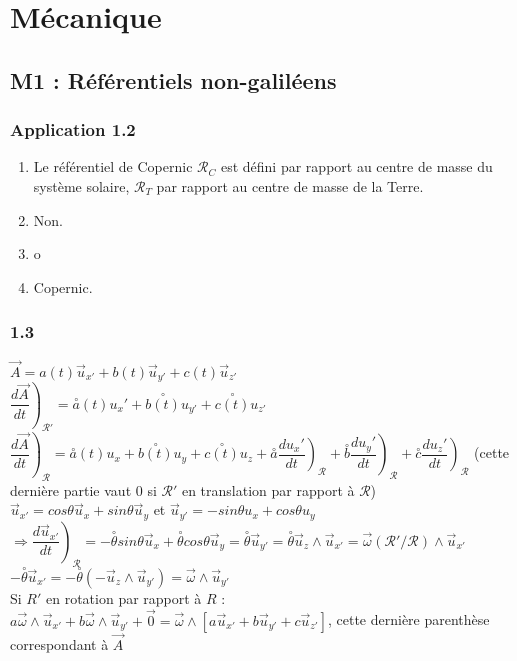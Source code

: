 \documentclass[a4paper,12pt]{book}
\begin{document}
\tableofcontents
\chapter{Mécanique}
\section{M1 :  Référentiels non-galiléens}
\subsection{Application 1.2}
\begin{enumerate}
\item Le référentiel de Copernic $\mathcal{R}_C$ est défini par rapport au centre de masse du système solaire, $\mathcal{R}_T$ par rapport au centre de masse de la Terre.
\item Non.
\item o
\item Copernic.
\end{enumerate}

\subsection{1.3}
$\vec{A} = a(t)\vec{u}_{x'} + b(t)\vec{u}_{y'} + c(t)\vec{u}_{z'}$
\\ $\left.\dfrac{d\vec{A}}{dt}\right)_{\mathcal{R}'} = \overset{\circ}{a}(t)u_x' + \overset{\circ}{b(t)}u_{y'} + \overset{\circ}{c(t)}u_{z'}$
\\ $\left.\dfrac{d\vec{A}}{dt}\right)_{\mathcal{R}} = \overset{\circ}{a}(t)u_x + \overset{\circ}{b(t)}u_y + \overset{\circ}{c(t)}u_z + \left.\overset{\circ}{a}\dfrac{du_x'}{dt}\right)_{\mathcal{R}} + \left.\overset{\circ}{b}\dfrac{du_y'}{dt}\right)_{\mathcal{R}} + \left.\overset{\circ}{c}\dfrac{du_z'}{dt}\right)_{\mathcal{R}}$ (cette dernière partie vaut 0 si $\mathcal{R}'$ en translation par rapport à $\mathcal{R}$)
\\ $\vec{u}_{x'} = cos\theta \vec{u}_x + sin\theta \vec{u}_y$ et $\vec{u}_{y'} = -sin\theta u_x + cos\theta u_y$
\\ $\Rightarrow \left.\dfrac{d\vec{u}_{x'}}{dt}\right)_{\mathcal{R}} = -\overset{\circ}{\theta} sin\theta \vec{u}_x + \overset{\circ}{\theta} cos\theta \vec{u}_y = \overset{\circ}{\theta} \vec{u}_{y'} = \overset{\circ}{\theta} \vec{u}_z\wedge \vec{u}_{x'} = \vec{\omega}(\mathcal{R}'/\mathcal{R})\wedge \vec{u}_{x'}$
\\$ -\overset{\circ}{\theta} \vec{u}_{x'}= -\overset{\circ}{\theta} (-\vec{u}_z\wedge \vec{u}_{y'}) = \vec{\omega}\wedge \vec{u}_{y'}$
\\ Si $R'$ en rotation par rapport à $R$ : $a\vec{\omega}\wedge \vec{u}_{x'} + b\vec{\omega}\wedge \vec{u}_{y'} + \vec{0} = \vec{\omega}\wedge\left[a\vec{u}_{x'}+b\vec{u}_{y'} + c\vec{u}_{z'}\right]$, cette dernière parenthèse correspondant à $\vec{A}$
\end{document}
